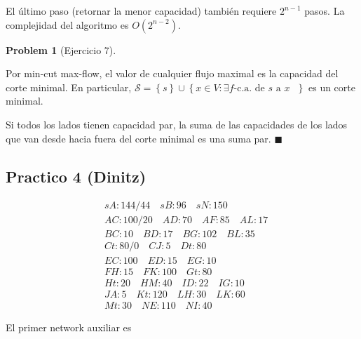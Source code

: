 \documentclass[a4paper]{article}
\newtheorem{problem}{Problem}
\newtheorem{problem}{Problem}
\begin{document}
El último paso (retornar la menor capacidad) también requiere $2^{n-1}$ pasos.
La complejidad del algoritmo es $O(2^{n-2})$.

\begin{problem}[Ejercicio 7]
    
\end{problem}

Por min-cut max-flow, el valor de cualquier flujo maximal es la capacidad del
corte minimal. En particular, $\mathcal{S} = \left\{ s \right\} \cup  \left\{ x
\in V : \exists f\text{-c.a.} \text{ de $s$ a $x$ }\right\} $ es un corte
minimal.

Si todos los lados tienen capacidad par, la suma de las
capacidades de los lados que van desde hacia fuera del corte minimal es una suma
par. $\blacksquare$

\pagebreak 

\subsection{Practico 4 (Dinitz)}

\begin{align*}
&sA: 144/44 \quad sB: 96 \quad sN: 150 \\ 
&AC: 100 / 20 \quad AD: 70 \quad AF: 85 \quad AL: 17\\
&BC: 10 \quad BD :17 \quad BG :102 \quad BL: 35 \\
&Ct: 80/0 \quad CJ :5 \quad Dt: 80\\
&EC: 100 \quad ED: 15 \quad EG: 10\\
&FH: 15 \quad FK :100 \quad Gt: 80\\
&Ht: 20 \quad HM :40 \quad ID :22 \quad IG :10 \\
&JA: 5 \quad Kt :120 \quad LH :30 \quad LK :60 \\ 
&Mt: 30 \quad NE: 110 \quad NI: 40
\end{align*}


El primer network auxiliar es 
\end{document}
